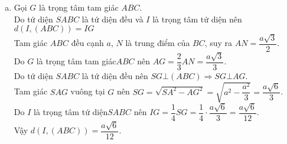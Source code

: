 \begin{ex}
{\begin{enumerate}[a)]
			Suy ra $\vec{SB}+\vec{SC}+\vec{AB}+\vec{AC}=2\left(\vec{SN}+\vec{AN}\right)$\\
			Do $M$ là trung điểm của $SA$ nên $\vec{NA}+\vec{NS}=2\vec{NM}\Leftrightarrow \vec{AN}+\vec{SN}=2\vec{MN}$.\\
			Do đó $\vec{SB}+\vec{SC}+\vec{AB}+\vec{AC}=2 \cdot 2 \cdot \vec{MN}=4\vec{MN}$.
			\item Gọi $G$ là trọng tâm tam giác $ABC$.\\
			Do tứ diện $SABC$ là tứ diện đều và $I$ là trọng tâm tứ diện nên $d\left(I,(ABC)\right)=IG$\\
			Tam giác $ABC$ đều cạnh $a$, $N$ là trung điểm của $BC$, suy ra $AN=\dfrac{a\sqrt{3}}{2}$.\\
			Do $G$ là trọng tâm tam giác$ABC$ nên $AG=\dfrac{2}{3}AN=\dfrac{a\sqrt{3}}{3}$.\\
			Do tứ diện $SABC$ là tứ diện đều nên $SG\bot (ABC)\Rightarrow SG\bot AG$.\\
			Tam giác $SAG$ vuông tại $G$ nên $SG=\sqrt{SA^2-AG^2}=\sqrt{a^2-\dfrac{a^2}{3}}=\dfrac{a\sqrt{6}}{3}$.\\
			Do $I$ là trọng tâm tứ diện$SABC$ nên $IG=\dfrac{1}{4}SG=\dfrac{1}{4} \cdot \dfrac{a\sqrt{6}}{3}=\dfrac{a\sqrt{6}}{12}$.\\
			Vậy $d\left(I,(ABC)\right)=\dfrac{a\sqrt{6}}{12}$.
		\end{enumerate}
	}
\end{ex}
